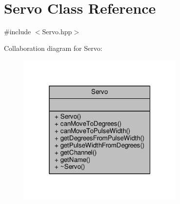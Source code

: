\hypertarget{class_servo}{}\section{Servo Class Reference}
\label{class_servo}


{\ttfamily \#include $<$Servo.\+hpp$>$}



Collaboration diagram for Servo\+:
\nopagebreak
\begin{figure}[H]
\begin{center}
\leavevmode
\includegraphics[width=235pt]{class_servo__coll__graph}
\end{center}
\end{figure}
